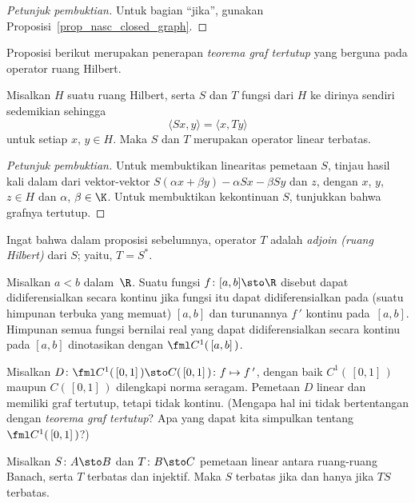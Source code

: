 \begin{proof}[\emph{Petunjuk pembuktian}] Untuk bagian ``jika'', gunakan Proposisi~\ref{prop_nasc_closed_graph}.  \ns
\end{proof}

Proposisi berikut merupakan penerapan \emph{teorema graf tertutup} yang berguna pada operator ruang Hilbert.

\begin{prop} Misalkan $H$ suatu ruang Hilbert, serta $S$ dan $T$ fungsi dari $H$ ke dirinya sendiri sedemikian sehingga
    \[ \langle Sx,y \rangle = \langle x,Ty \rangle \]
untuk setiap $x$, $y \in H$.  Maka $S$ dan $T$ merupakan operator linear terbatas.
\end{prop}

\begin{proof}[\emph{Petunjuk pembuktian}] Untuk membuktikan linearitas pemetaan $S$, tinjau hasil kali dalam dari vektor-vektor
$S(\alpha x + \beta y) - \alpha Sx - \beta Sy$ dan $z$, dengan $x$, $y$, $z \in H$ dan $\alpha$, $\beta \in \K$.
Untuk membuktikan kekontinuan $S$, tunjukkan bahwa grafnya tertutup.  \ns
\end{proof}

Ingat bahwa dalam proposisi sebelumnya, operator $T$ adalah \emph{adjoin (ruang Hilbert)} dari $S$;
yaitu, $T = S^*$.

\begin{defn} Misalkan $a < b$ dalam~$\R$. Suatu fungsi $f\colon [a,b] \sto \R$ disebut
dapat didiferensialkan secara kontinu jika fungsi itu dapat didiferensialkan pada (suatu himpunan terbuka yang memuat) $[a,b]$
dan turunannya $f\,'$ kontinu pada~$[a,b]$.  Himpunan semua fungsi bernilai real yang dapat
didiferensialkan secara kontinu pada $[a,b]$ dinotasikan dengan $\fml C^1(\,[a,b]\,)$.
\end{defn}

\begin{exam} Misalkan $D\colon \fml C^1(\,[0,1]\,) \sto C(\,[0,1]\,)\colon f \mapsto f\,'$, dengan
baik $C^1(\,[0,1]\,)$ maupun $C(\,[0,1]\,)$ dilengkapi norma seragam. Pemetaan
$D$ linear dan memiliki graf tertutup, tetapi tidak kontinu.  (Mengapa hal ini tidak bertentangan dengan
\emph{teorema graf tertutup}?  Apa yang dapat kita simpulkan tentang~$\fml C^1(\,[0,1]\,)$?)
\end{exam}

\begin{prop} Misalkan $S\colon A \sto B$ dan $T\colon B \sto C$ pemetaan linear antara
ruang-ruang Banach, serta $T$ terbatas dan injektif.  Maka $S$ terbatas jika dan hanya jika $TS$ terbatas.
\end{prop}











